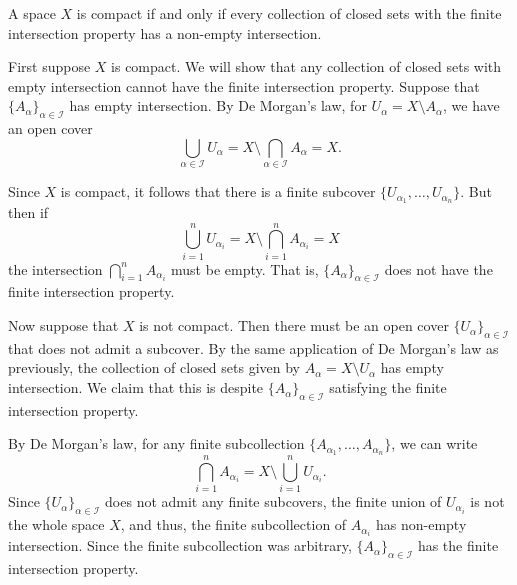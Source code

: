 \documentclass[12 pt, letterpaper]{hmcpset}
\begin{document}
\pagebreak

\begin{problem}[6.5]
	A space $X$ is compact if and only if every collection of closed sets with the finite intersection property has a non-empty intersection.
\end{problem}

\begin{solution}
	
First suppose $X$ is compact. We will show that any collection of closed sets with empty intersection cannot have the finite intersection property. Suppose that $\{ A_{\alpha} \}_{\alpha \in \mathcal{I}}$ has empty intersection. By De Morgan's law, for $U_{\alpha} = {X \setminus A_{\alpha}}$, we have an open cover
\[
	\bigcup_{\alpha \in \mathcal{I}} U_{\alpha} = X \setminus \bigcap_{\alpha \in \mathcal{I}} A_{\alpha} = X.
\]

Since $X$ is compact, it follows that there is a finite subcover $\{ U_{\alpha_{1}}, \dots, U_{\alpha_{n}} \}$. But then if
\[
	\bigcup_{i = 1}^n U_{\alpha_{i}} = X \setminus \bigcap_{i = 1}^n A_{\alpha_{i}} = X
\]
the intersection $\bigcap_{i = 1}^n A_{\alpha_{i}}$ must be empty. That is, $\{ A_{\alpha} \}_{\alpha \in \mathcal{I}}$ does not have the finite intersection property.

Now suppose that $X$ is not compact. Then there must be an open cover $\{ U_{\alpha} \}_{\alpha \in \mathcal{I}}$ that does not admit a subcover. By the same application of De Morgan's law as previously, the collection of closed sets given by $A_{\alpha} = {X \setminus U_{\alpha}}$ has empty intersection. We claim that this is despite $\{ A_{\alpha} \}_{\alpha \in \mathcal{I}}$ satisfying the finite intersection property. 

By De Morgan's law, for any finite subcollection $\{ A_{\alpha_{1}}, \dots, A_{\alpha_{n}} \}$, we can write
\[
	\bigcap_{i = 1}^n A_{\alpha_{i}} = X \setminus \bigcup_{i = 1}^n U_{\alpha_{i}}.
\]
Since $\{ U_{\alpha} \}_{\alpha \in \mathcal{I}}$ does not admit any finite subcovers, the finite union of $U_{\alpha_{i}}$ is not the whole space $X$, and thus, the finite subcollection of $A_{\alpha_{i}}$ has non-empty intersection. Since the finite subcollection was arbitrary, $\{ A_{\alpha} \}_{\alpha \in \mathcal{I}}$ has the finite intersection property.

\end{solution}
\end{document}
